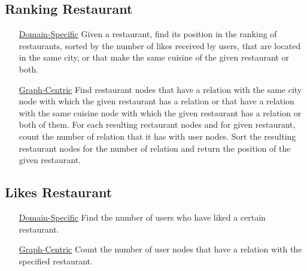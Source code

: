\subsection{Ranking Restaurant}
\begin{itemize}
	\item [\underline{Domain-Specific}] Given a restaurant, find its
		position in the ranking of restaurants, sorted by the number of
		likes received by users, that are located in the same city, or
		that make the same cuisine of the given restaurant or both.
	\item [\underline{Graph-Centric}] Find restaurant nodes that have a
		 relation with the same city node with which the
		given restaurant has a  relation or that have a
		 relation with the same cuisine node with which the
		given restaurant has a  relation or both of them.
		For each resulting restaurant nodes and for given restaurant,
		count the number of  relation that it has with user
		nodes. Sort the resulting restaurant nodes for the number of
		 relation and return the position of the given
		restaurant.
\end{itemize}

\subsection{Likes Restaurant}
\begin{itemize}
	\item [\underline{Domain-Specific}] Find the number of users who have
		liked a certain restaurant.
	\item [\underline{Graph-Centric}] Count the number of user nodes that
		have a  relation with the specified restaurant.
\end{itemize}
